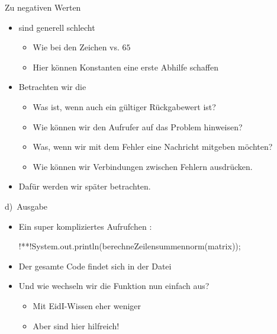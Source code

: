 \iffull
{\AddonFrame
\begin{frame}{Zu negativen Werten}
    \begin{itemize}[<+(1)->]
        \itemsep12pt
        \item {} sind generell schlecht \begin{itemize}
            \item Wie bei den Zeichen  vs. \(65\)
            \item Hier können Konstanten eine erste Abhilfe schaffen
        \end{itemize}
        \item Betrachten wir die  \begin{itemize}
            \item Was ist, wenn  auch ein gültiger Rückgabewert ist?
            \item Wie können wir den Aufrufer auf das Problem hinweisen?
            \item Was, wenn wir mit dem Fehler eine Nachricht mitgeben möchten?
            \item Wie können wir Verbindungen zwischen Fehlern ausdrücken.
        \end{itemize}
        \item Dafür werden wir später  betrachten.
    \end{itemize}
\end{frame}
}
\fi

\begin{frame}[fragile]{d)~Ausgabe}
\begin{itemize}[<+(1)->]
    \itemsep8pt
    \item Ein super kompliziertes Aufrufchen :
\begin{plainjava}[aboveskip=0pt]
!**!System.out.println(berechneZeilensummennorm(matrix));
\end{plainjava}
    \item<4-> Der gesamte Code findet sich in der Datei 
    \item<5-> Und wie wechseln wir die Funktion nun einfach aus? \begin{itemize}
        \item<6-> Mit EidI-Wissen eher weniger
        \item<7-> Aber  sind hier hilfreich!
    \end{itemize}
\end{itemize}
\end{frame}

